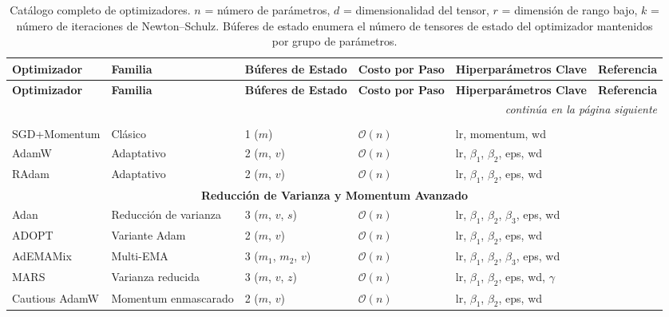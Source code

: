 \footnotesize
\begin{longtable}{p{2.0cm}p{2.0cm}p{2.2cm}p{2.0cm}p{3.8cm}p{2.5cm}}
\toprule
\textbf{Optimizador} & \textbf{Familia} & \textbf{Búferes de Estado} & \textbf{Costo por Paso} & \textbf{Hiperparámetros Clave} & \textbf{Referencia} \\
\midrule
\endfirsthead
\toprule
\textbf{Optimizador} & \textbf{Familia} & \textbf{Búferes de Estado} & \textbf{Costo por Paso} & \textbf{Hiperparámetros Clave} & \textbf{Referencia} \\
\midrule
\endhead
\midrule
\multicolumn{6}{r}{\textit{continúa en la página siguiente}} \\
\endfoot
\bottomrule
\caption{Catálogo completo de optimizadores. $n$ = número de parámetros, $d$ = dimensionalidad del tensor, $r$ = dimensión de rango bajo, $k$ = número de iteraciones de Newton--Schulz. Búferes de estado enumera el número de tensores de estado del optimizador mantenidos por grupo de parámetros.}
\label{tab:all-optimizers}
\endlastfoot

\multicolumn{6}{c}{\textbf{Líneas Base Clásicas y Adaptativas}} \\
\midrule
SGD+Momentum & Clásico & 1 ($m$) & $\mathcal{O}(n)$ & lr, momentum, wd & \citep{polyak_1964} \\
AdamW & Adaptativo & 2 ($m$, $v$) & $\mathcal{O}(n)$ & lr, $\beta_1$, $\beta_2$, eps, wd & \citep{loshchilov_decoupled_2017} \\
RAdam & Adaptativo & 2 ($m$, $v$) & $\mathcal{O}(n)$ & lr, $\beta_1$, $\beta_2$, eps, wd & \citep{liu_variance_2019} \\
\midrule

\multicolumn{6}{c}{\textbf{Reducción de Varianza y Momentum Avanzado}} \\
\midrule
Adan & Reducción de varianza & 3 ($m$, $v$, $s$) & $\mathcal{O}(n)$ & lr, $\beta_1$, $\beta_2$, $\beta_3$, eps, wd & \citep{xie_adan_2022} \\
ADOPT & Variante Adam & 2 ($m$, $v$) & $\mathcal{O}(n)$ & lr, $\beta_1$, $\beta_2$, eps, wd & \citep{taniguchi_adopt_2024} \\
AdEMAMix & Multi-EMA & 3 ($m_1$, $m_2$, $v$) & $\mathcal{O}(n)$ & lr, $\beta_1$, $\beta_2$, $\beta_3$, eps, wd & \citep{pagliardini_ademamix_2024} \\
MARS & Varianza reducida & 3 ($m$, $v$, $z$) & $\mathcal{O}(n)$ & lr, $\beta_1$, $\beta_2$, eps, wd, $\gamma$ & \citep{yuan_mars_2024} \\
Cautious AdamW & Momentum enmascarado & 2 ($m$, $v$) & $\mathcal{O}(n)$ & lr, $\beta_1$, $\beta_2$, eps, wd & \citep{liang_cautious_2024} \\
\midrule


\end{longtable}
